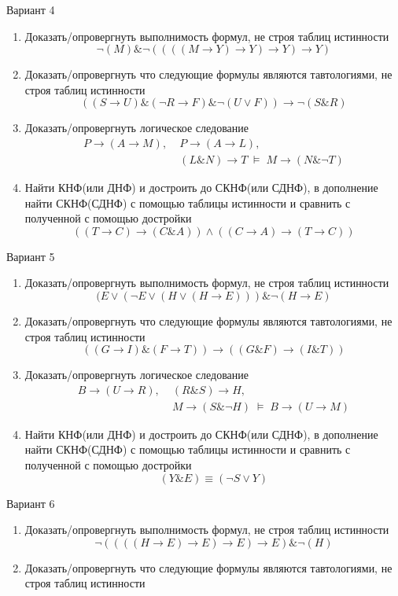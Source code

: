 \documentclass[10pt,a4paper]{article}
\begin{document}
\begin{multicols}{2}
Вариант 4
\begin{enumerate}
\item Доказать/опровергнуть выполнимость формул, не строя таблиц истинности
$$\neg(M)\&\neg((((M\to Y)\to Y)\to Y)\to Y)$$
\item Доказать/опровергнуть что следующие формулы являются тавтологиями, не строя таблиц истинности
$$((S\to U)\&(\neg R\to F)\&\neg(U\vee F))\to\neg(S\& R)$$
\item Доказать/опровергнуть логическое следование
\begin{equation*}\begin{split}P\to (A\to M),\;& P\to(A\to L),\; \\& (L\& N)\to T\;\models\; M\to(N\&\neg T)\end{split}\end{equation*}
\item Найти КНФ(или ДНФ) и достроить до СКНФ(или СДНФ), в дополнение найти СКНФ(СДНФ) с помощью таблицы истинности и сравнить с полученной с помощью достройки
$$((T\to C)\to(C\& A))\wedge((C\to A)\to(T\to C))$$
\end{enumerate}
Вариант 5
\begin{enumerate}
\item Доказать/опровергнуть выполнимость формул, не строя таблиц истинности
$$(E\vee(\neg E\vee(H\vee(H\to E)))\&\neg(H\to E)$$
\item Доказать/опровергнуть что следующие формулы являются тавтологиями, не строя таблиц истинности
$$((G\to I)\&(F\to T))\to((G\& F)\to(I\&T))$$
\item Доказать/опровергнуть логическое следование
\begin{equation*}\begin{split}B\to(U\to R),\;& (R\& S)\to H,\; \\& M\to(S\&\neg H)\;\models\; B\to (U\to M)\end{split}\end{equation*}
\item Найти КНФ(или ДНФ) и достроить до СКНФ(или СДНФ), в дополнение найти СКНФ(СДНФ) с помощью таблицы истинности и сравнить с полученной с помощью достройки
$$(Y\& E)\equiv(\neg S \vee Y)$$
\end{enumerate}
Вариант 6
\begin{enumerate}
\item Доказать/опровергнуть выполнимость формул, не строя таблиц истинности
$$\neg((((H\to E)\to E)\to E)\to E)\&\neg(H)$$
\item Доказать/опровергнуть что следующие формулы являются тавтологиями, не строя таблиц истинности

\end{enumerate}
\end{multicols}
\end{document}
